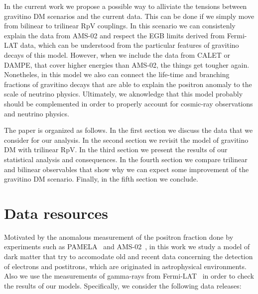 \documentclass[a4paper,11pt]{article}
\begin{document}
In the current work we propose a possible way to alliviate the tensions between gravitino DM scenarios and the current data. This can be done if we simply move from bilinear to trilinear RpV couplings. In this scenario we can consistenly explain the data from AMS-02 and respect the EGB limits derived from Fermi-LAT data, which can be understood from the particular features of gravitino decays of this model. However, when we include the data from CALET or DAMPE, that cover higher energies than AMS-02, the things get tougher again. Nonetheles, in this model we also can connect the life-time and branching fractions of gravitino decays that are able to explain the positron anomaly to the scale of neutrino physics. Ultimately, we aknowledge that this model probably should be complemented in order to properly account for cosmic-ray observations and neutrino physics.

The paper is organized as follows. In the first section we discuss the data that we consider for our analysis. In the second section we revisit the model of gravitino DM with trilinear RpV. In the third section we present the results of our statistical analysis and consequences. In the fourth section we compare trilinear and bilinear observables that show why we can expect some improvement of the gravitino DM scenario. Finally, in the fifth section we conclude.


\section{Data resources}

Motivated by the anomalous measurement of the positron fraction done by experiments such as PAMELA~\cite{Adriani:2008zr} and AMS-02~\cite{Accardo:2014lma}, in this work we study a model of dark matter that try to accomodate old and recent data concerning the detection of electrons and postitrons, which are originated in astrophysical environments. Also we use the measurements of gamma-rays from Fermi-LAT~\cite{Ackermann:2014usa} in order to check the results of our models. Specifically, we consider the following data releases:
\end{document}
